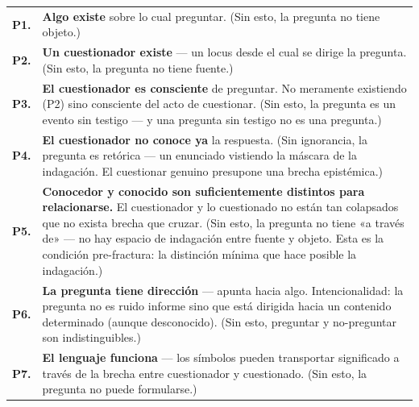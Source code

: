 \documentclass[10pt, openany, oneside]{book}
\renewcommand{\footnotesize}{\fontsize{8.5}{11}\selectfont}
\begin{document}
{\footnotesize
\noindent\begin{tabular}{r p{}}
\textbf{P1.} & \textbf{Algo existe} sobre lo cual preguntar. (Sin esto, la pregunta no tiene objeto.) \\[0.3em]
\textbf{P2.} & \textbf{Un cuestionador existe} --- un locus desde el cual se dirige la pregunta. (Sin esto, la pregunta no tiene fuente.) \\[0.3em]
\textbf{P3.} & \textbf{El cuestionador es consciente} de preguntar. No meramente existiendo (P2) sino consciente del acto de cuestionar. (Sin esto, la pregunta es un evento sin testigo --- y una pregunta sin testigo no es una pregunta.) \\[0.3em]
\textbf{P4.} & \textbf{El cuestionador no conoce ya} la respuesta. (Sin ignorancia, la pregunta es retórica --- un enunciado vistiendo la máscara de la indagación. El cuestionar genuino presupone una brecha epistémica.) \\[0.3em]
\textbf{P5.} & \textbf{Conocedor y conocido son suficientemente distintos para relacionarse.} El cuestionador y lo cuestionado no están tan colapsados que no exista brecha que cruzar. (Sin esto, la pregunta no tiene «a través de» --- no hay espacio de indagación entre fuente y objeto. Esta es la condición pre-fractura: la distinción mínima que hace posible la indagación.) \\[0.3em]
\textbf{P6.} & \textbf{La pregunta tiene dirección} --- apunta hacia algo. Intencionalidad: la pregunta no es ruido informe sino que está dirigida hacia un contenido determinado (aunque desconocido). (Sin esto, preguntar y no-preguntar son indistinguibles.) \\[0.3em]
\textbf{P7.} & \textbf{El lenguaje funciona} --- los símbolos pueden transportar significado a través de la brecha entre cuestionador y cuestionado. (Sin esto, la pregunta no puede formularse.) \\[0.3em]
\end{tabular}
}
\end{document}
